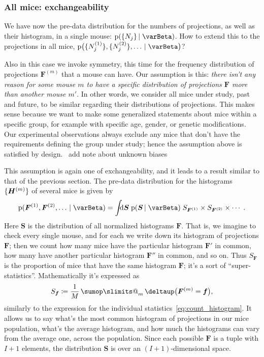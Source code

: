 \documentclass[\ifafour a4paper,12pt,\else a5paper,10pt,\fi%
onecolumn,oneside,article,%
british%
]{memoir}
\makeatletter
\theoremstyle{remark}
\theoremstyle{innote}
\def\sum{\DOTSI\sumop\slimits@}
\newcommand*{\delt}{\deltaup}%
\newcommand*{\di}{\mathrm{d}}%
\newcommand*{\defd}{\coloneqq}
\newcommand*{\pf}{\mathrm{p}}%
\renewcommand*{\|}[1][]{\nonscript\,#1\vert\nonscript\;\mathopen{}}
\newcommand*{\tsum}{\mathop{\textstyle\sum}\nolimits}
\newcommand*{\puzzle}{{\fontencoding{U}\fontfamily{fontawesometwo}\selectfont\symbol{225}}}
\newcommand{\mynote}[1]{ {\color{notecolour}\puzzle\ #1}}
\newcommand*{\yI}{\varBeta}
\newcommand*{\yF}{\bm{F}}
\newcommand*{\yFm}[1][m]{\yF^{(#1)}}
\newcommand*{\yH}{\bm{H}}
\newcommand*{\yHm}[1][m]{\yH^{(#1)}}
\newcommand*{\yNm}[1][m]{N^{(#1)}}
\newcommand*{\ySS}{S}
\newcommand*{\yS}{\bm{\ySS}}
\DeclarePairedDelimiter\tu{\{}{\}}
\makeatother
\begin{document}
\subsubsection{All mice: exchangeability}
\label{sec:allmice_exch}

We have now the pre-data distribution for the numbers of projections, as
well as their histogram, in a single mouse: $\pf(\tu{N_{j}} \| \yI)$. How
to extend this to the projections in all mice,
$\pf\bigl(\tu{\yNm[1]_{j}}, \tu{\yNm[2]_{j}}, \dotsc \| \yI\bigr)$?

Also in this case we invoke symmetry, this time for the frequency
distribution of projections $\yFm$ that a mouse can have. Our assumption is
this: \emph{there isn't any reason for some mouse $m$ to have a specific
  distribution of projections $\yF$ more than another mouse $m'$}. In other
words, we consider all mice under study, past and future, to be similar
regarding their distributions of projections. This makes sense because we
want to make some generalized statements about mice within a specific
group, for example with specific age, gender, or genetic modifications. Our
experimental observations always exclude any mice that don't have the
requirements defining the group under study; hence the assumption above is
satisfied by design. \mynote{add note about unknown biases}

This assumption is again one of exchangeability, and it leads to a result
similar to that of the previous section. The pre-data distribution for the
histograms $\tu{\yHm}$ of several mice is given by
\begin{equation}
  \label{eq:distr_H_mice}
  \pf( \yFm[1], \yFm[2], \dotsc \| \yI) =
  \int\!\!\!\di \yS\;
  \pf(\yS \| \yI)\;
  \ySS_{\yFm[1]} \times \ySS_{\yFm[2]} \times \dotsm\;.
\end{equation}
Here $\yS$ is the distribution of all normalized histograms $\yF$. That is,
we imagine to check every single mouse, and for each we write down 
its histogram of projections $\yF$; then we count how many mice have the
particular histogram $\yF'$ in common, how many have another particular
histogram $\yF''$ in common, and so on. Thus $\ySS_{\yF}$ is the proportion
of mice that have the same histogram $\yF$; it's a sort of
\enquote{super-statistics}. Mathematically it's expressed as
  \begin{equation}
    \label{eq:count_superhistogram}
    \ySS_{\bm{f}} \defd \frac{1}{M} \tsum_{m} \delt\bigl(\yFm = \bm{f}\bigr),
\end{equation}
similarly to the expression for the individual
statistics~\eqref{eq:count_histogram}. It allows us to say what's the most
common histogram of projections in our mice population, what's the average
histogram, and how much the histograms can vary from the average one,
across the population. Since each possible $\yF$ is a tuple with $I+1$
elements, the distribution $\yS$ is over an $(I+1)$-dimensional space.
\end{document}
